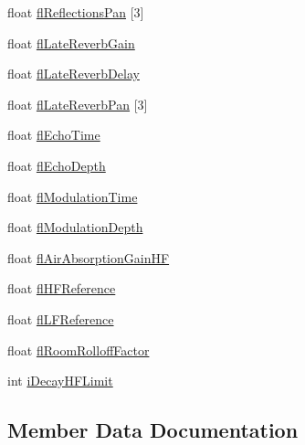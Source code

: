 \begin{DoxyCompactItemize}
\item 
float \mbox{\hyperlink{struct_e_f_x_e_a_x_r_e_v_e_r_b_p_r_o_p_e_r_t_i_e_s_a1e98ae2dcbd5cb25c6784b5f1181dbb1}{fl\+Reflections\+Pan}} \mbox{[}3\mbox{]}
\item 
float \mbox{\hyperlink{struct_e_f_x_e_a_x_r_e_v_e_r_b_p_r_o_p_e_r_t_i_e_s_ac32101bd6ea23d41a39100d1036a4acf}{fl\+Late\+Reverb\+Gain}}
\item 
float \mbox{\hyperlink{struct_e_f_x_e_a_x_r_e_v_e_r_b_p_r_o_p_e_r_t_i_e_s_a45c5f6a516e4ffd08ccd6bd35a15b3c2}{fl\+Late\+Reverb\+Delay}}
\item 
float \mbox{\hyperlink{struct_e_f_x_e_a_x_r_e_v_e_r_b_p_r_o_p_e_r_t_i_e_s_ae8a3cba02be4a6e4af41c551b1856c84}{fl\+Late\+Reverb\+Pan}} \mbox{[}3\mbox{]}
\item 
float \mbox{\hyperlink{struct_e_f_x_e_a_x_r_e_v_e_r_b_p_r_o_p_e_r_t_i_e_s_aa1ad488819884fe0ca9a6ac3cb4ab581}{fl\+Echo\+Time}}
\item 
float \mbox{\hyperlink{struct_e_f_x_e_a_x_r_e_v_e_r_b_p_r_o_p_e_r_t_i_e_s_ae1b2a5691ad36203427b70856158f50f}{fl\+Echo\+Depth}}
\item 
float \mbox{\hyperlink{struct_e_f_x_e_a_x_r_e_v_e_r_b_p_r_o_p_e_r_t_i_e_s_a607ea8692513389b603e9851fb9f14dc}{fl\+Modulation\+Time}}
\item 
float \mbox{\hyperlink{struct_e_f_x_e_a_x_r_e_v_e_r_b_p_r_o_p_e_r_t_i_e_s_ab3d44b53ddcc1e6d295b89e8fa28a8af}{fl\+Modulation\+Depth}}
\item 
float \mbox{\hyperlink{struct_e_f_x_e_a_x_r_e_v_e_r_b_p_r_o_p_e_r_t_i_e_s_a80c8ad56521d0918975aaba19edcd1be}{fl\+Air\+Absorption\+Gain\+HF}}
\item 
float \mbox{\hyperlink{struct_e_f_x_e_a_x_r_e_v_e_r_b_p_r_o_p_e_r_t_i_e_s_af42ea95461db17e0b73b0a4decf720c3}{fl\+H\+F\+Reference}}
\item 
float \mbox{\hyperlink{struct_e_f_x_e_a_x_r_e_v_e_r_b_p_r_o_p_e_r_t_i_e_s_a9d7409aeb14b972f77fd83643d7ecfaa}{fl\+L\+F\+Reference}}
\item 
float \mbox{\hyperlink{struct_e_f_x_e_a_x_r_e_v_e_r_b_p_r_o_p_e_r_t_i_e_s_addd42aea886c8930594cf15f91fb8bec}{fl\+Room\+Rolloff\+Factor}}
\item 
int \mbox{\hyperlink{struct_e_f_x_e_a_x_r_e_v_e_r_b_p_r_o_p_e_r_t_i_e_s_a454d6bbeaeaf108414712439d36679ff}{i\+Decay\+H\+F\+Limit}}
\end{DoxyCompactItemize}


\subsection{Member Data Documentation}
\mbox{\label{struct_e_f_x_e_a_x_r_e_v_e_r_b_p_r_o_p_e_r_t_i_e_s_a80c8ad56521d0918975aaba19edcd1be}} 
